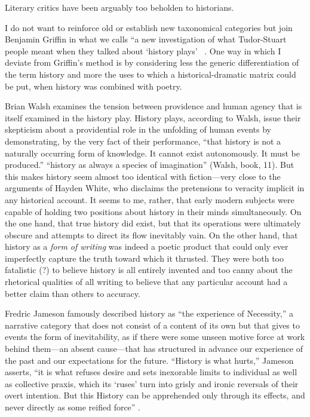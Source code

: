 Literary critics have been arguably too beholden to historians.

I do not want to reinforce old or establish new taxonomical categories but join Benjamin Griffin in what we calls ``a new investigation of what Tudor-Stuart people meant when they talked about `history plays' ~\cite[8]{Griffin}. One way in which I deviate from Griffin's method is by considering less the generic differentiation of the term history and more the uses to which a historical-dramatic matrix could be put, when history was combined with poetry.

Brian Walsh examines the tension between providence and human agency that is itself examined in the history play. History plays, according to Walsh, issue their skepticism about a providential role in the unfolding of human events by demonstrating, by the very fact of their performance, ``that history is not a naturally occurring form of knowledge. It cannot exist autonomously. It must be produced.'' ``history as always a species of imagination'' (Walsh, book, 11). But this makes history seem almost too identical with fiction---very close to the arguments of Hayden White, who disclaims the pretensions to veracity implicit in any historical account. It seems to me, rather, that early modern subjects were capable of holding two positions about history in their minds simultaneously. On the one hand, that true history did exist, but that its operations were ultimately obscure and attempts to direct its flow inevitably vain. On the other hand, that history as a \emph{form of writing} was indeed a poetic product that could only ever imperfectly capture the truth toward which it thrusted. They were both too fatalistic (?) to believe history is all entirely invented and too canny about the rhetorical qualities of all writing to believe that any particular account had a better claim than others to accuracy.

Fredric Jameson famously described history as ``the experience of Necessity,'' a narrative category that does not consist of a content of its own but that gives to events the form of inevitability, as if there were some unseen motive force at work behind them---an absent cause---that has structured in advance our experience of the past and our expectations for the future. ``History is what hurts,'' Jameson asserts, ``it is what refuses desire and sets inexorable limits to individual as well as collective praxis, which its `ruses' turn into grisly and ironic reversals of their overt intention. But this History can be apprehended only through its effects, and never directly as some reified force'' \cite[87--88]{Jameson}.

